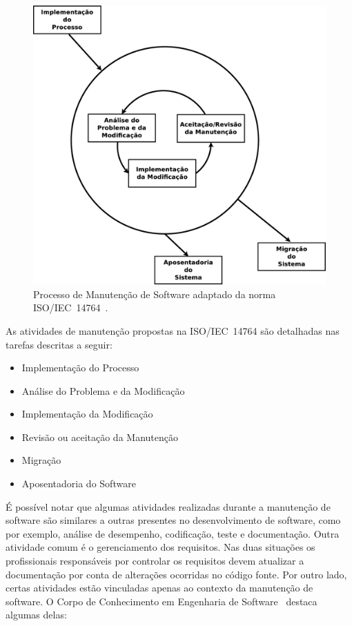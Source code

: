 \begin{figure}[htpb]
    \centering
    \includegraphics[width=0.9\linewidth]
    {chapter-manutencao-software-visao-geral/img/ieee-14764-processo-manutencao.eps}
    \caption{Processo de Manutenção de Software adaptado da norma
        ISO/IEC~14764~\cite{institute2006norma}.}\label{fig:ieee-14764-processo-manutencao}
\end{figure}

As atividades de manutenção propostas na ISO/IEC~14764 são detalhadas nas
tarefas descritas a seguir:

\begin{itemize}
   	\item Implementação do Processo
   	\item Análise do Problema e da Modificação
    \item Implementação da Modificação
	\item Revisão ou aceitação da Manutenção
   	\item Migração
   	\item Aposentadoria do Software
\end{itemize}

É possível notar que algumas atividades realizadas durante a manutenção de
software são similares a outras presentes no desenvolvimento de software, como
por exemplo, análise de desempenho, codificação, teste e documentação. Outra
atividade comum é o gerenciamento dos requisitos. Nas duas situações os
profissionais responsáveis por controlar os requisitos devem atualizar a
do\-cu\-men\-ta\-ção  por conta de alterações ocorridas no código fonte. Por
outro lado, certas atividades estão vinculadas apenas ao contexto da manutenção
de software. O Corpo de Conhecimento em Engenharia de
Software~\cite{IEEEComputerSociety:2014:GSE:2616205} destaca algumas delas:

